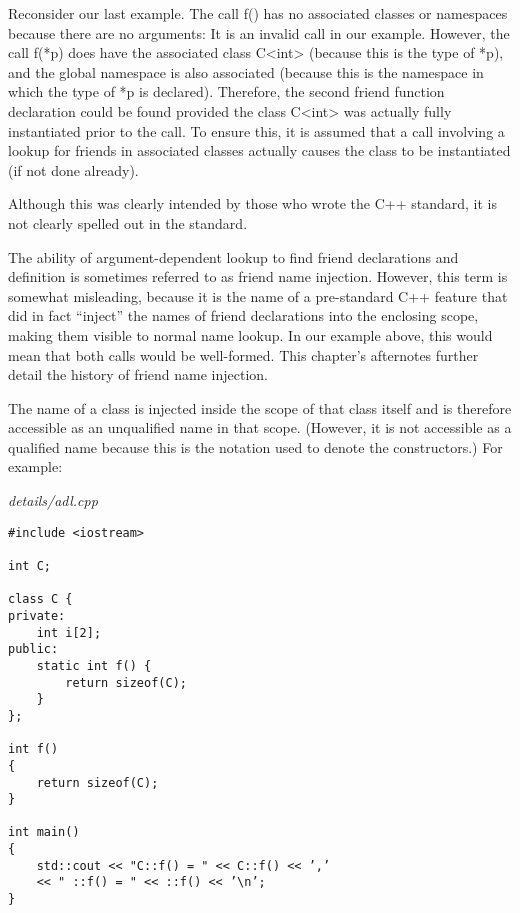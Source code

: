 Reconsider our last example. The call f() has no associated classes or namespaces because there are no arguments: It is an invalid call in our example. However, the call f(*p) does have the associated class C<int> (because this is the type of *p), and the global namespace is also associated (because this is the namespace in which the type of *p is declared). Therefore, the second friend function declaration could be found provided the class C<int> was actually fully instantiated prior to the call. To ensure this, it is assumed that a call involving a lookup for friends in associated classes actually causes the class to be instantiated (if not done already).

\begin{tcolorbox}[colback=webgreen!5!white,colframe=webgreen!75!black]
\hspace*{0.75cm}Although this was clearly intended by those who wrote the C++ standard, it is not clearly spelled out in the standard.
\end{tcolorbox}

The ability of argument-dependent lookup to find friend declarations and definition is sometimes referred to as friend name injection. However, this term is somewhat misleading, because it is the name of a pre-standard C++ feature that did in fact “inject” the names of friend declarations into the enclosing scope, making them visible to normal name lookup. In our example above, this would mean that both calls would be well-formed. This chapter’s afternotes further detail the history of friend name injection.


The name of a class is injected inside the scope of that class itself and is therefore accessible as an unqualified name in that scope. (However, it is not accessible as a qualified name because this is the notation used to denote the constructors.) For example:

\noindent
\textit{details/adl.cpp}
\begin{lstlisting}[style=styleCXX]
#include <iostream>

int C;

class C {
private:
	int i[2];
public:
	static int f() {
		return sizeof(C);
	}
};

int f()
{
	return sizeof(C);
}

int main()
{
	std::cout << "C::f() = " << C::f() << ’,’
	<< " ::f() = " << ::f() << ’\n’;
}
\end{lstlisting}

